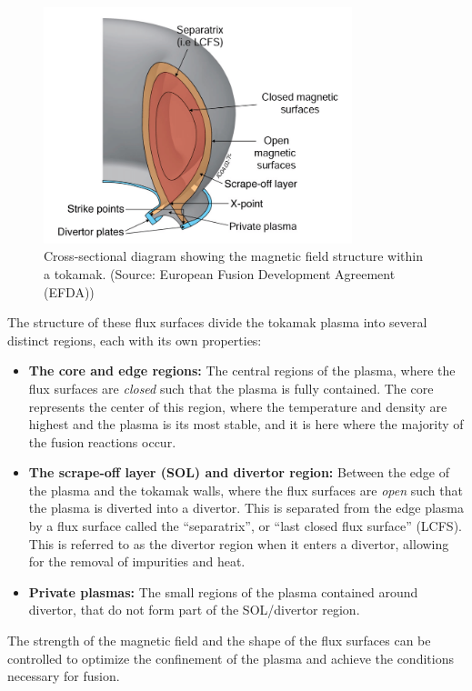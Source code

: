     \begin{figure}[!ht]
        \centering
        \includegraphics[width = 0.8\textwidth]{1 - plasmas/3 - tokamaks/images/tokamak structure.png}
        \caption{Cross-sectional diagram showing the magnetic field structure within a tokamak. (Source: European Fusion Development Agreement (EFDA))}
        \label{fig:tokamak structure}
    \end{figure}

    The structure of these flux surfaces divide the tokamak plasma into several distinct regions, each with its own properties:
    \begin{itemize}
        \item  {\bf The core and edge regions:} The central regions of the plasma, where the flux surfaces are \emph{closed} such that the plasma is fully contained. The core represents the center of this region, where the temperature and density are highest and the plasma is its most stable, and it is here where the majority of the fusion reactions occur.
        \item  {\bf The scrape-off layer (SOL) and divertor region:} Between the edge of the plasma and the tokamak walls, where the flux surfaces are \emph{open} such that the plasma is diverted into a divertor. This is separated from the edge plasma by a flux surface called the ``separatrix'', or ``last closed flux surface'' (LCFS). This is referred to as the divertor region when it enters a divertor, allowing for the removal of impurities and heat.
        \item  {\bf Private plasmas:} The small regions of the plasma contained around divertor, that do not form part of the SOL/divertor region.
    \end{itemize}
    The strength of the magnetic field and the shape of the flux surfaces can be controlled to optimize the confinement of the plasma and achieve the conditions necessary for fusion.
    